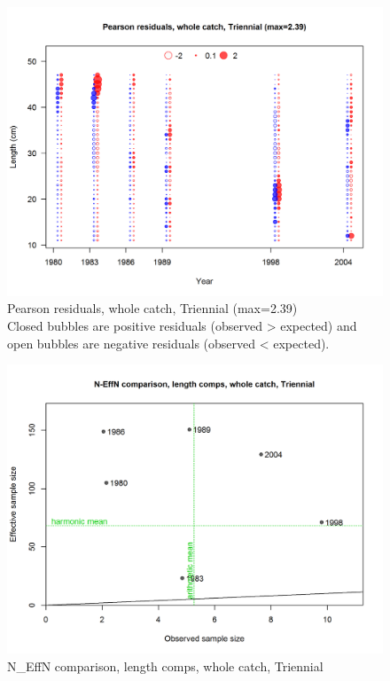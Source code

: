 \documentclass[12pt,]{article}
\begin{document}
\begin{figure}
\centering
\includegraphics{./r4ss/plots_mod1/comp_lenfit_residsflt5mkt0.png}
\caption{Pearson residuals, whole catch, Triennial (max=2.39)\\
Closed bubbles are positive residuals (observed \textgreater{} expected)
and open bubbles are negative residuals (observed \textless{} expected).
\label{fig:mod1_19_comp_lenfit_residsflt5mkt0}}
\end{figure}

\begin{figure}
\centering
\includegraphics{./r4ss/plots_mod1/comp_lenfit_sampsize_flt5mkt0.png}
\caption{N\_EffN comparison, length comps, whole catch, Triennial
\label{fig:mod1_20_comp_lenfit_sampsize_flt5mkt0}}
\end{figure}
\end{document}
